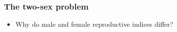 \documentclass{beamer}
\begin{document}

\begin{frame}
\frametitle{The two-sex problem}
\begin{itemize}
  \item Why do male and female reproductive indices differ?
\end{itemize}
\end{frame}

\end{document}
